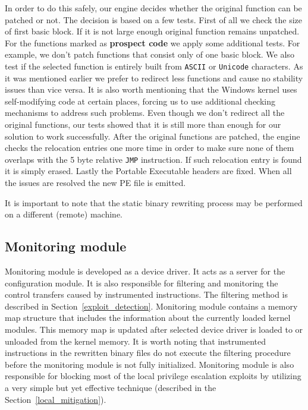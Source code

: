 \documentclass[10pt,twocolumn,a4paper]{article}
\begin{document}
In order to do this safely, our engine decides whether the original function can be patched or not. The decision is based on a few tests. First of all we check the size of first basic block. If it is not large enough original function remains unpatched. For the functions marked as {\textbf{prospect code}} we apply some additional tests. For example, we don't patch functions that consist only of one basic block. We also test if the selected function is entirely built from {\tt{ASCII}} or {\tt{Unicode}} characters. As it was mentioned earlier we prefer to redirect less functions and cause no stability issues than vice versa. It is also worth mentioning that the Windows kernel uses self-modifying code at certain places, forcing us to use additional checking mechanisms to address such problems. Even though we don't redirect all the original functions, our tests showed that it is still more than enough for our solution to work successfully. After the original functions are patched, the engine checks the relocation entries one more time in order to make sure none of them overlaps with the 5 byte relative {\tt{JMP}} instruction. If such relocation entry is found it is simply erased. Lastly the Portable Executable headers are fixed. When all the issues are resolved the new PE file is emitted.

It is important to note that the static binary rewriting process may be performed on a different (remote) machine.

\subsection{Monitoring module}

Monitoring module is developed as a device driver. It acts as a server for the configuration module. It is also responsible for filtering and monitoring the control transfers caused by instrumented instructions. The filtering method is described in Section~\ref{exploit_detection}. Monitoring module contains a memory map structure that includes the information about the currently loaded kernel modules. This memory map is updated after selected device driver is loaded to or unloaded from the kernel memory. It is worth noting that instrumented instructions in the rewritten binary files do not execute the filtering procedure before the monitoring module is not fully initialized. Monitoring module is also responsible for blocking most of the local privilege escalation exploits by utilizing a very simple but yet effective technique (described in the Section~\ref{local_mitigation}).
\end{document}
